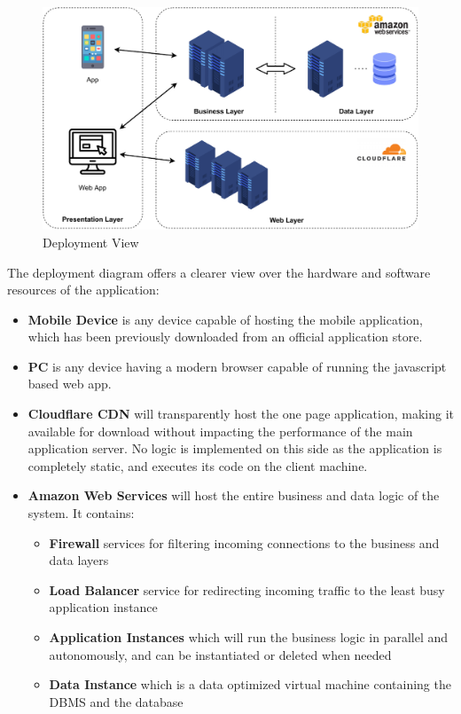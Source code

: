 \begin{figure}[H]
    \includegraphics[width=\linewidth]{images/draw.io/deployment.pdf}
    \caption{Deployment View}
    \label{fig:deployment_view}
\end{figure}

The deployment diagram offers a clearer view over the hardware and software resources of the application:
\begin{itemize}
    \item \textbf{Mobile Device} is any device capable of hosting the mobile application, which has been previously downloaded from an official application store.
    \item \textbf{PC} is any device having a modern browser capable of running the javascript based web app.
    \item \textbf{Cloudflare CDN} will transparently host the one page application, making it available for download without impacting the performance of the main application server. No logic is implemented on this side as the application is completely static, and executes its code on the client machine.
    \item \textbf{Amazon Web Services} will host the entire business and data logic of the system. It contains:
    \begin{itemize}
        \item \textbf{Firewall} services for filtering incoming connections to the business and data layers
        \item \textbf{Load Balancer} service for redirecting incoming traffic to the least busy application instance
        \item \textbf{Application Instances} which will run the business logic in parallel and autonomously, and can be instantiated or deleted when needed
        \item \textbf{Data Instance} which is a data optimized virtual machine containing the DBMS and the database
    \end{itemize}
\end{itemize}

